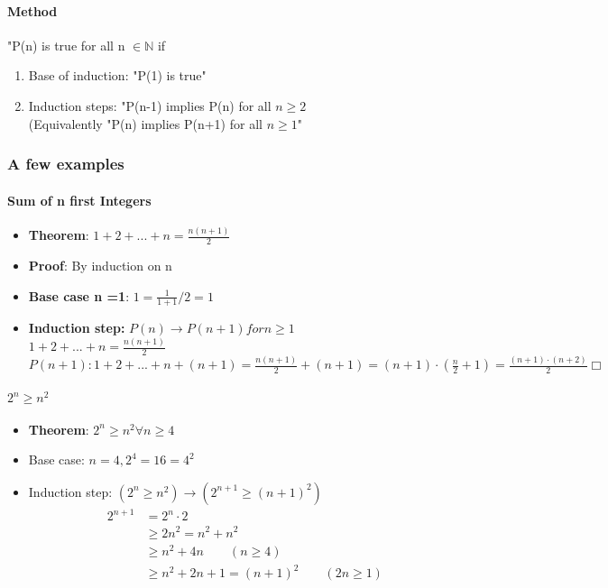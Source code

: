 \documentclass[9pt, letterpaper, oneside]{article}
\begin{document}
\paragraph{Method}
"P(n) is true for all n $\in \mathbb{N}$ if
\begin{enumerate}
	\item Base of induction: "P(1) is true"
	\item Induction steps: "P(n-1) implies P(n) for all $n \geq 2$ \\
	(Equivalently  "P(n) implies P(n+1) for all $n \geq 1$"
\end{enumerate}

\subsubsection{A few examples}

\paragraph{Sum of n first Integers}
\begin{itemize}
	\item \textbf{Theorem}: $1 + 2 + ... +n = \frac{n(n+1)}{2}$
	\item \textbf{Proof}: By induction on n
	\item \textbf{Base case n =1}: $1 = \frac{1}{1+1}/2 = 1$
	\item \textbf{Induction step:} $P(n) \to P(n+1) for n \geq 1$\\
			$1 + 2 + ... + n = \frac{n(n+1)}{2}$
			$P(n+1): 1 + 2 + ... +n + (n+1) = \frac{n(n+1)}{2} + (n + 1) = (n + 1) \cdot ( \frac{n}{2} + 1) = \frac{(n+1) \cdot (n + 2)}{2} \Box$
\end{itemize}

\paragraph{$2^n \geq n^2$}
\begin{itemize}
	\item \textbf{Theorem}: $2^n \geq n^2 \forall n \geq 4$
	\item Base case: $n = 4, 2^4 = 16 = 4^2$
	\item Induction step: $(2^n \geq n^2) \to (2^{n+1} \geq (n+1)^2)$
		\begin{align*}
		2^{n+1} &= 2^n \cdot 2 \\
		&\geq 2n^2 = n^2 + n^2 \\
		&\geq n^2 + 4n \qquad (n \geq 4) \\
		&\geq n^2 + 2n + 1 = (n + 1)^2 \qquad (2n \geq 1) \\
		\end{align*}
\end{itemize}
\end{document}
